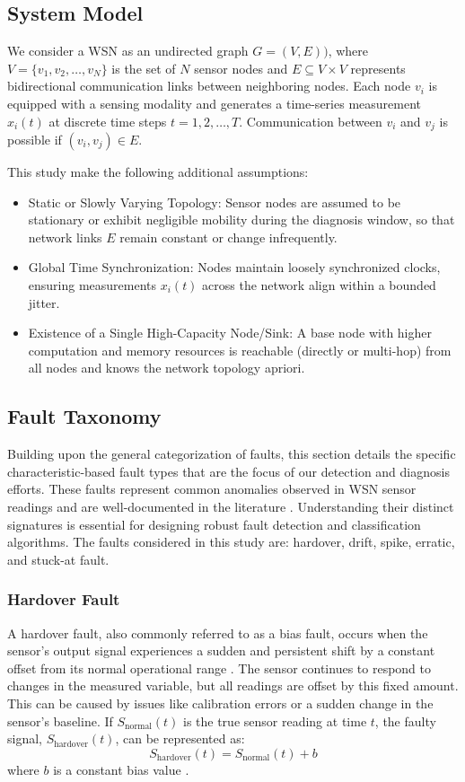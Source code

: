 \subsection{System Model}
We consider a WSN as an undirected graph \(G=(V,E))\), where \(V=\{v_1, v_2, \ldots, v_N\}\) is the set of \(N\) sensor nodes and \(E \subseteq V \times V\) represents bidirectional communication links between neighboring nodes. Each node \(v_i\) is equipped with a sensing modality and generates a time-series measurement \(x_i(t)\) at discrete time steps \(t=1, 2, \ldots, T\). Communication between \(v_i\) and \(v_j\) is possible if \((v_i,v_j) \in E\). 

This study make the following additional assumptions:
\begin{itemize}
  \item Static or Slowly Varying Topology: Sensor nodes are assumed to be stationary or exhibit negligible mobility during the diagnosis window, so that network links \(E\) remain constant or change infrequently.
  \item Global Time Synchronization: Nodes maintain loosely synchronized clocks, ensuring measurements \(x_i(t)\) across the network align within a bounded jitter. 
  \item Existence of a Single High-Capacity Node/Sink: A base node with higher computation and memory resources is reachable (directly or multi-hop) from all nodes and knows the network topology apriori. 
\end{itemize}

\subsection{Fault Taxonomy}
\label{subsec:types}
Building upon the general categorization of faults, this section details the specific characteristic-based fault types that are the focus of our detection and diagnosis efforts. These faults represent common anomalies observed in WSN sensor readings and are well-documented in the literature \cite{Saeed2021, Hasan2024, Shi2024, Ni2009}. Understanding their distinct signatures is essential for designing robust fault detection and classification algorithms. The faults considered in this study are: hardover, drift, spike, erratic, and stuck-at fault. 

\subsubsection{Hardover Fault}
A hardover fault, also commonly referred to as a bias fault, occurs when the sensor's output signal experiences a sudden and persistent shift by a constant offset from its normal operational range \cite{Saeed2021, Shi2024, Hasan2024}. The sensor continues to respond to changes in the measured variable, but all readings are offset by this fixed amount. This can be caused by issues like calibration errors or a sudden change in the sensor's baseline. If \(S_\text{normal}(t)\) is the true sensor reading at time \(t\), the faulty signal, \(S_\text{hardover}(t)\), can be represented as:
\[S_\text{hardover}(t) = S_\text{normal}(t) + b\]
where \(b\) is a constant bias value \cite{Saeed2021}.


